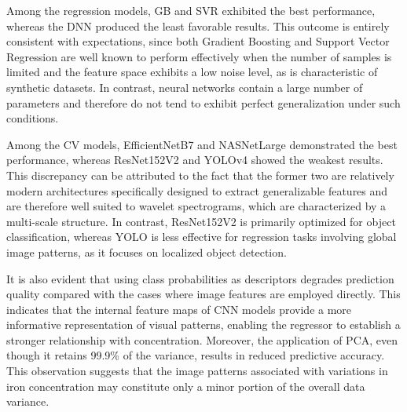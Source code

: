 \documentclass[10pt]{iopart}
\begin{document}
Among the regression models, GB and SVR exhibited the best performance, 
whereas the DNN produced the least favorable results. 
This outcome is entirely consistent with expectations, 
since both Gradient Boosting and Support Vector Regression are well known to perform effectively 
when the number of samples is limited and the feature space exhibits a low noise level, as is characteristic of synthetic datasets. 
In contrast, neural networks contain a large number of parameters and therefore do not tend to exhibit perfect generalization under such conditions.

Among the CV models, EfficientNetB7 and NASNetLarge demonstrated the best performance, 
whereas ResNet152V2 and YOLOv4 showed the weakest results. 
This discrepancy can be attributed to the fact that the former two are relatively modern architectures 
specifically designed to extract generalizable features and are therefore well suited to wavelet spectrograms, 
which are characterized by a multi-scale structure. 
In contrast, ResNet152V2 is primarily optimized for object classification, whereas YOLO is less effective for regression 
tasks involving global image patterns, as it focuses on localized object detection.

It is also evident that using class probabilities as descriptors degrades prediction quality 
compared with the cases where image features are employed directly. 
This indicates that the internal feature maps of CNN models provide a more informative representation of visual patterns, 
enabling the regressor to establish a stronger relationship with concentration. 
Moreover, the application of PCA, even though it retains 99.9\% of the variance, results in reduced predictive accuracy.
This observation suggests that the image patterns associated with variations in iron concentration may constitute 
only a minor portion of the overall data variance.
\end{document}
